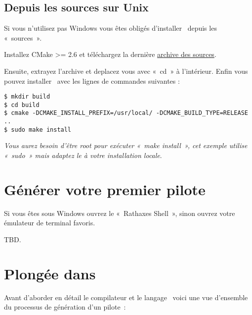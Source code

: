 \documentclass[francais]{rtxarticle}
\begin{document}
\subsection{Depuis les sources sur Unix}

Si vous n'utilisez pas Windows vous êtes obligés d'installer \rtx\ depuis les
«~sources~».

Installez CMake >= 2.6 et téléchargez la dernière
\href{http://rathaxes.googlecode.com/files/rathaxes-src-latest.tar.gz}{archive
des sources}.

Ensuite, extrayez l'archive et deplacez vous avec «~cd~» à l'intérieur. Enfin
vous pouvez installer \rtx\ avec les lignes de commandes suivantes :

\begin{lstlisting}
$ mkdir build
$ cd build
$ cmake -DCMAKE_INSTALL_PREFIX=/usr/local/ -DCMAKE_BUILD_TYPE=RELEASE ..
$ sudo make install
\end{lstlisting}

\emph{Vous aurez besoin d'être root pour exécuter «~make install~», cet exemple
utilise «~sudo~» mais adaptez le à votre installation locale}.

\section{Générer votre premier pilote}

Si vous êtes sous Windows ouvrez le «~Rathaxes Shell~», sinon ouvrez votre
émulateur de terminal favoris.

TBD.

\newpage

\section{Plongée dans \rtx}

Avant d'aborder en détail le compilateur et le langage \rtx\ voici une vue
d'ensemble du processus de génération d'un pilote~:
\end{document}
